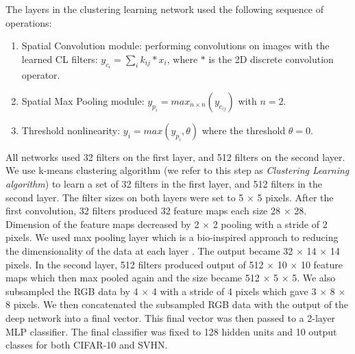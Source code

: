 \documentclass{article} %
\begin{document}
The layers in the clustering learning network used the following sequence of operations:
\begin{enumerate}
\item Spatial Convolution module: performing convolutions on images with the learned CL filters: $y_{c_i}=\sum_i{k_{ij}\ast x_i}$,
where $\ast$ is the 2D discrete convolution operator.
\item Spatial Max Pooling module: $y_{p_i} = max_{n \times n}(y_{c_{ij}})$ with $n = 2$.
\item Threshold nonlinearity: $y_i = max(y_{p_i}, \theta)$ where the threshold $\theta = 0$.
\end{enumerate}

All networks used 32 filters on the first layer, and 512 filters on the second layer.
We use k-means clustering algorithm (we refer to this step as \textit{Clustering Learning algorithm})
to learn a set of 32 filters in the first layer, and 512 filters in the second layer.
The filter sizes on both layers were set to 5 $\times$ 5 pixels.
After the first convolution, 32 filters produced 32 feature maps each size 28 $\times$ 28.
Dimension of the feature maps decreased by 2 $\times$ 2 pooling with a stride of 2 pixels.
We used max pooling layer which is a bio-inspired approach to reducing the dimensionality of the data at each layer \cite{lampl2004intracellular}.
The output became 32 $\times$ 14 $\times$ 14 pixels.
In the second layer, 512 filters produced output of 512 $\times$ 10 $\times$ 10 feature maps which then max pooled again and the size became 512 $\times$ 5 $\times$ 5. 
We also subsampled the RGB data by 4 $\times$ 4 with a stride of 4 pixels which gave 3 $\times$ 8 $\times$ 8 pixels.
We then concatenated the subsampled RGB data with the output of the deep network into a final vector.
This final vector was then passed to a 2-layer MLP classifier.
The final classifier was fixed to 128 hidden units and 10 output classes for both CIFAR-10 and SVHN.



\end{document}
